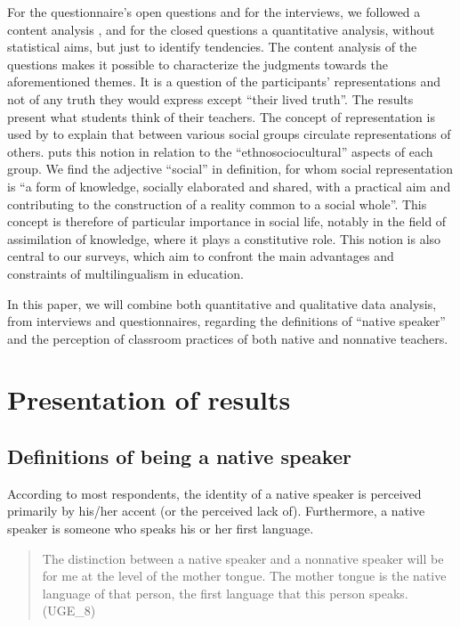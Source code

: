 \documentclass[output=paper]{../langscibook}
\begin{document}
For the questionnaire’s open questions and for the interviews, we followed a content analysis \citep{Bardin1993}, and for the closed questions a quantitative analysis, without statistical aims, but just to identify tendencies. The content analysis of the questions makes it possible to characterize the judgments towards the aforementioned themes. It is a question of the participants’ representations and not of any truth they would express except “their lived truth”. The results present what students think of their teachers. The concept of representation is used by \citet{Durkheim1960} to explain that between various social groups circulate representations of others. \citet{Boyer1995} puts this notion in relation to the “ethnosociocultural” aspects of each group. We find the adjective “social” in  definition, for whom social representation is “a form of knowledge, socially elaborated and shared, with a practical aim and contributing to the construction of a reality common to a social whole”. This concept is therefore of particular importance in social life, notably in the field of assimilation of knowledge, where it plays a constitutive role. This notion is also central to our surveys, which aim to confront the main advantages and constraints of multilingualism in education.

In this paper, we will combine both quantitative and qualitative data analysis, from interviews and questionnaires, regarding the definitions of “native speaker” and the perception of classroom practices of both native and nonnative teachers.

\section{Presentation of results}

\subsection{Definitions of being a native speaker}

According to most respondents, the identity of a native speaker is perceived primarily by his/her accent (or the perceived lack of). Furthermore, a native speaker is someone who speaks his or her first language. 

\begin{quote}
The distinction between a native speaker and a nonnative speaker will be for me at the level of the mother tongue. The mother tongue is the native language of that person, the first language that this person speaks. (UGE\_8)
\end{quote}
\end{document}
